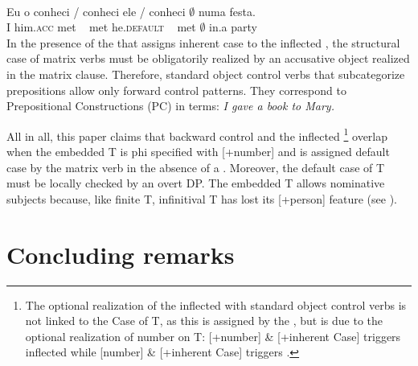 \documentclass[output=paper]{langsci/langscibook}
\begin{document}
\ea%
    \citep[328]{Farrell1990}\label{ex:moreno:29}\\
    \gll Eu  o       conheci \slash{} conheci ele        \slash{}  conheci {$\emptyset$} numa festa. \\
         I  him.\textsc{acc} met  ~  met  he.\textsc{default} ~ met   {$\emptyset$} in.a    party\\
\z
In the presence of the  that assigns inherent case to the inflected , the structural case of matrix verbs must be obligatorily realized by an accusative object realized in the matrix clause. Therefore, standard object control verbs that subcategorize prepositions allow only forward control patterns. They correspond to Prepositional Constructions (PC) in  terms: \textit{I gave a book to Mary.}

All in all, this paper claims that backward control and the inflected \footnote{The optional realization of the inflected  with standard object control verbs is not linked to the Case of T, as this is assigned by the , but is due to the optional realization of number on T: [+number] \& [+inherent Case]  triggers inflected  while [\textminus number] \& [+inherent Case] triggers  .} overlap when the embedded T is phi specified with [+number] and is assigned default case by the matrix verb in the absence of a . Moreover, the default case of T must be locally checked by an overt DP. The embedded T allows nominative subjects because, like finite T, infinitival T has lost its [+person] feature (see \citealt{Cyrino2010}).

\section{Concluding remarks}%
\end{document}
